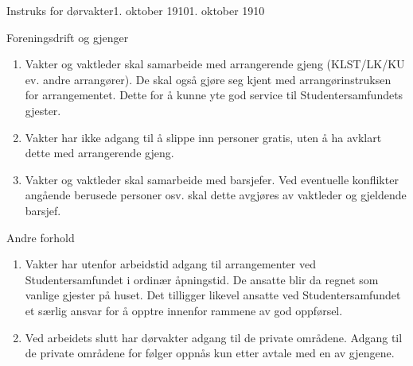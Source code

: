 \begin{instruks}{Instruks for dørvakter}{1. oktober 1910}{1. oktober 1910}
    \begin{instruksledd}{Foreningsdrift og gjenger}
        \begin{enumerate}
            \item Vakter og vaktleder skal samarbeide med arrangerende gjeng (KLST/LK/KU ev. andre arrangører). De skal
                også gjøre seg kjent med arrangørinstruksen for arrangementet. Dette for å kunne yte god service til
                Studentersamfundets gjester.
            \item Vakter har ikke adgang til å slippe inn personer gratis, uten å ha avklart dette med arrangerende gjeng.
            \item Vakter og vaktleder skal samarbeide med barsjefer. Ved eventuelle konflikter angående berusede personer
                osv. skal dette avgjøres av vaktleder og gjeldende barsjef.
        \end{enumerate}    
    \end{instruksledd}

    \begin{instruksledd}{Andre forhold}
        \begin{enumerate}
            \item Vakter har utenfor arbeidstid adgang til arrangementer ved Studentersamfundet i ordinær åpningstid. De
                ansatte blir da regnet som vanlige gjester på huset. Det tilligger likevel ansatte ved Studentersamfundet et
                særlig ansvar for å opptre innenfor rammene av god oppførsel.
            \item Ved arbeidets slutt har dørvakter adgang til de private områdene. Adgang til de private områdene for følger
                oppnås kun etter avtale med en av gjengene. 
        \end{enumerate}
    \end{instruksledd}
\end{instruks}


